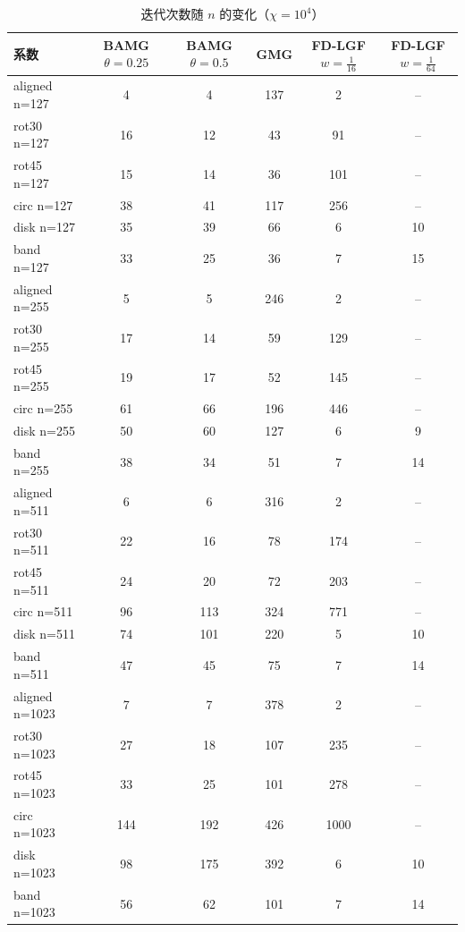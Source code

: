 \begin{table}[H]\centering\small
\caption{迭代次数随 $n$ 的变化（$\chi=10^{4}$）}\label{tab:n4}
\begin{tabular}{lccccc}
\toprule
系数 & BAMG $\theta{=}0.25$ & BAMG $\theta{=}0.5$ & GMG & FD-LGF $w{=}\frac1{16}$ & FD-LGF $w{=}\frac1{64}$ \\
\midrule
aligned n=127 & 4 & 4 & 137 & 2 & -- \\
rot30 n=127 & 16 & 12 & 43 & 91 & -- \\
rot45 n=127 & 15 & 14 & 36 & 101 & -- \\
circ n=127 & 38 & 41 & 117 & 256 & -- \\
disk n=127 & 35 & 39 & 66 & 6 & 10 \\
band n=127 & 33 & 25 & 36 & 7 & 15 \\
aligned n=255 & 5 & 5 & 246 & 2 & -- \\
rot30 n=255 & 17 & 14 & 59 & 129 & -- \\
rot45 n=255 & 19 & 17 & 52 & 145 & -- \\
circ n=255 & 61 & 66 & 196 & 446 & -- \\
disk n=255 & 50 & 60 & 127 & 6 & 9 \\
band n=255 & 38 & 34 & 51 & 7 & 14 \\
aligned n=511 & 6 & 6 & 316 & 2 & -- \\
rot30 n=511 & 22 & 16 & 78 & 174 & -- \\
rot45 n=511 & 24 & 20 & 72 & 203 & -- \\
circ n=511 & 96 & 113 & 324 & 771 & -- \\
disk n=511 & 74 & 101 & 220 & 5 & 10 \\
band n=511 & 47 & 45 & 75 & 7 & 14 \\
aligned n=1023 & 7 & 7 & 378 & 2 & -- \\
rot30 n=1023 & 27 & 18 & 107 & 235 & -- \\
rot45 n=1023 & 33 & 25 & 101 & 278 & -- \\
circ n=1023 & 144 & 192 & 426 & 1000 & -- \\
disk n=1023 & 98 & 175 & 392 & 6 & 10 \\
band n=1023 & 56 & 62 & 101 & 7 & 14 \\
\bottomrule
\end{tabular}
\end{table}

